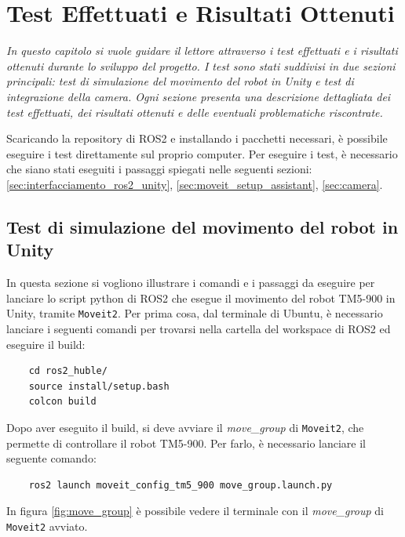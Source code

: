 \documentclass[11pt]{report}
\begin{document}
\chapter{Test Effettuati e Risultati Ottenuti}
\label{cap:Test}
\textit{In questo capitolo si vuole guidare il lettore attraverso i test effettuati e i risultati ottenuti durante lo sviluppo del progetto. I test sono stati suddivisi in due sezioni principali: test di simulazione del movimento del robot in Unity e test di integrazione della camera. Ogni sezione presenta una descrizione dettagliata dei test effettuati, dei risultati ottenuti e delle eventuali problematiche riscontrate.}

Scaricando la repository di ROS2 \cite{Repository_ROS2} e installando i pacchetti necessari, è possibile eseguire i test direttamente sul proprio computer. Per eseguire i test, è necessario che siano stati eseguiti i passaggi spiegati nelle seguenti sezioni: \ref{sec:interfacciamento_ros2_unity}, \ref{sec:moveit_setup_assistant}, \ref{sec:camera}.

\section{Test di simulazione del movimento del robot in Unity}
\label{sec:Test_simulazione}    
In questa sezione si vogliono illustrare i comandi e i passaggi da eseguire per lanciare lo script python di ROS2 che esegue il movimento del robot TM5-900 in Unity, tramite \texttt{Moveit2}. 
\newline
Per prima cosa, dal terminale di Ubuntu, è necessario lanciare i seguenti comandi per trovarsi nella cartella del workspace di ROS2 ed eseguire il build:

\begin{verbatim}
    cd ros2_huble/
    source install/setup.bash
    colcon build 
\end{verbatim}

Dopo aver eseguito il build, si deve avviare il \textit{move\_group} di \texttt{Moveit2}, che permette di controllare il robot TM5-900. Per farlo, è necessario lanciare il seguente comando:
\begin{verbatim}
    ros2 launch moveit_config_tm5_900 move_group.launch.py
\end{verbatim}

In figura \ref{fig:move_group} è possibile vedere il terminale con il \textit{move\_group} di \texttt{Moveit2} avviato. 
\end{document}
